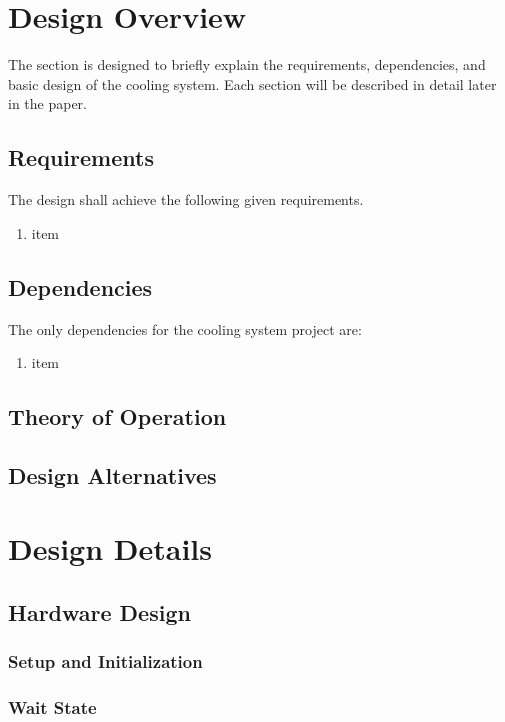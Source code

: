 \documentclass[11pt]{article}
\begin{document}
\section{Design Overview}
The section is designed to briefly explain the requirements, dependencies, and basic design of the cooling system. Each section 
will be described in detail later in the paper.
\subsection{Requirements}
The design shall achieve the following given requirements.
    \begin{enumerate}
        \item item
    \end{enumerate}

\subsection{Dependencies}
The only dependencies for the cooling system project are:
\begin{enumerate}
    \item item
\end{enumerate}

\subsection{Theory of Operation}

\subsection{Design Alternatives}

\section{Design Details}

\subsection{Hardware Design}

\subsubsection{Setup and Initialization}

\subsubsection{Wait State}
\end{document}
